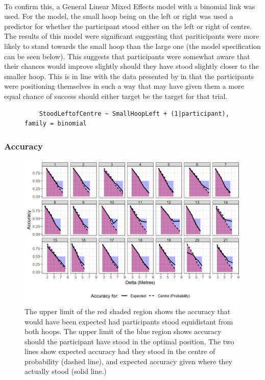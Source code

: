\documentclass[12pt]{article}
\begin{document}
\paragraph{} To confirm this, a General Linear Mixed Effects model with a binomial link was used. For the model, the small hoop being on the left or right was used a predictor for whether the participant stood either on the left or right of centre. The results of this model were significant suggesting that pariticipants were more likely to stand towards the small hoop than the large one (the model specification can be seen below). This suggests that participants were somewhat aware that their chances would improve slightly should they have stood slightly closer to the smaller hoop. This is in line with the data presented by \cite{CHAPMAN2010168} in that the participants were positioning themselves in such a way that may have given them a more equal chance of success should either target be the target for that trial.

\begin{figure}[!ht]
	\centering
	\begin{BVerbatim}
	StoodLeftofCentre ~ SmallHoopLeft + (1|participant), family = binomial
	\end{BVerbatim}
\end{figure}

\subsubsection*{Accuracy}
\begin{figure}[ht!]%
	\includegraphics[scale=0.9]{Figures/Experiment_3_Hoop_size/Accuracyshaded_regions}
	\centering
	\captionsetup{justification=centering}
	\caption{The upper limit of the red shaded region shows the accuracy that would have been expected had participants stood equidistant from both hoops. The upper limit of the blue region shows accuracy should the participant have stood in the optimal position. The two lines show expected accuracy had they stood in the centre of probability (dashed line), and expected accuracy given where they actually stood (solid line.)}
	\label{fig:Session2-Hoopsizes-Accuracy}
\end{figure}
\end{document}
